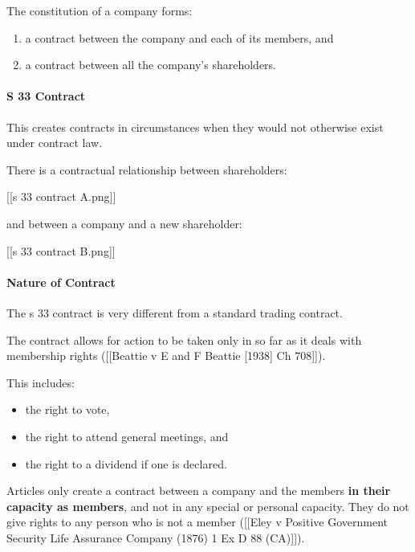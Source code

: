 \documentclass[
]{article}
\newenvironment{Shaded}{}{}
\newcommand{\NormalTok}[1]{#1}
\providecommand{\tightlist}{%
  \setlength{\itemsep}{0pt}\setlength{\parskip}{0pt}}
\begin{document}
The constitution of a company forms:

\begin{enumerate}
\def\labelenumi{\arabic{enumi}.}
\tightlist
\item
  a contract between the company and each of its members, and
\item
  a contract between all the company's shareholders.
\end{enumerate}

\hypertarget{s-33-contract}{%
\paragraph{S 33 Contract}\label{s-33-contract}}

This creates contracts in circumstances when they would not otherwise
exist under contract law.

There is a contractual relationship between shareholders:

{[}{[}s 33 contract A.png{]}{]}

and between a company and a new shareholder:

{[}{[}s 33 contract B.png{]}{]}

\hypertarget{nature-of-contract}{%
\paragraph{Nature of Contract}\label{nature-of-contract}}

The s 33 contract is very different from a standard trading contract.

\begin{Shaded}
\begin{Highlighting}[]
\NormalTok{The contract allows for action to be taken only in so far as it deals with membership rights ([[Beattie v E and F Beattie [1938] Ch 708]]).}
\end{Highlighting}
\end{Shaded}

This includes:

\begin{itemize}
\tightlist
\item
  the right to vote,
\item
  the right to attend general meetings, and
\item
  the right to a dividend if one is declared.
\end{itemize}

Articles only create a contract between a company and the members
\textbf{in their capacity as members}, and not in any special or
personal capacity. They do not give rights to any person who is not a
member ({[}{[}Eley v Positive Government Security Life Assurance Company
(1876) 1 Ex D 88 (CA){]}{]}).
\end{document}
